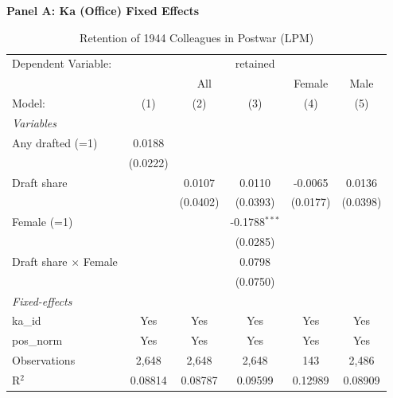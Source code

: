 \begin{table}[htbp]
\centering
\begin{threeparttable}
\caption{Retention of 1944 Colleagues in Postwar (LPM)}
\label{tab:retention}
\small
\textbf{Panel A: Ka (Office) Fixed Effects}\\[1ex]
\begingroup
\centering
\begin{tabular}{lccccc}
   \tabularnewline \midrule \midrule
   Dependent Variable: & \multicolumn{5}{c}{retained}\\
    & \multicolumn{3}{c}{All} & Female & Male \\ 
   Model:                       & (1)      & (2)      & (3)             & (4)      & (5)\\  
   \midrule
   \emph{Variables}\\
   Any drafted (=1)             & 0.0188   &          &                 &          &   \\   
                                & (0.0222) &          &                 &          &   \\   
   Draft share                  &          & 0.0107   & 0.0110          & -0.0065  & 0.0136\\   
                                &          & (0.0402) & (0.0393)        & (0.0177) & (0.0398)\\   
   Female (=1)                  &          &          & -0.1788$^{***}$ &          &   \\   
                                &          &          & (0.0285)        &          &   \\   
   Draft share $\times$ Female  &          &          & 0.0798          &          &   \\   
                                &          &          & (0.0750)        &          &   \\   
   \midrule
   \emph{Fixed-effects}\\
   ka\_id                       & Yes      & Yes      & Yes             & Yes      & Yes\\  
   pos\_norm                    & Yes      & Yes      & Yes             & Yes      & Yes\\  
   \midrule
   Observations                 & 2,648    & 2,648    & 2,648           & 143      & 2,486\\  
   R$^2$                        & 0.08814  & 0.08787  & 0.09599         & 0.12989  & 0.08909\\  
   \midrule \midrule

\end{tabular}
\end{threeparttable}
\end{table}
